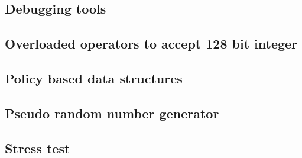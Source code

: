 \subsection{Debugging tools}
\raggedbottom
\hrulefill
\subsection{Overloaded operators to accept 128 bit integer}
\raggedbottom
\hrulefill
\subsection{Policy based data structures}
\raggedbottom
\hrulefill
\subsection{Pseudo random number generator}
\raggedbottom
\hrulefill
\subsection{Stress test}
\raggedbottom
\hrulefill
